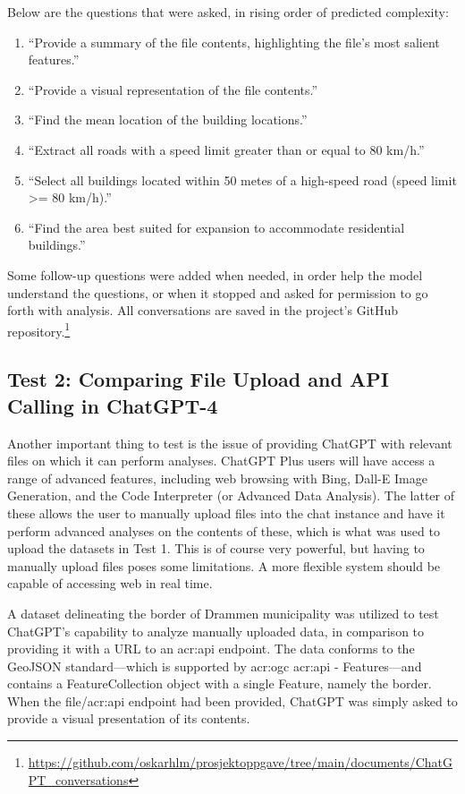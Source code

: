 Below are the questions that were asked, in rising order of predicted complexity:

\begin{enumerate}
    \item \enquote{Provide a summary of the file contents, highlighting the file's most salient features.}
    \item \enquote{Provide a visual representation of the file contents.}
    \item \enquote{Find the mean location of the building locations.}
    \item \enquote{Extract all roads with a speed limit greater than or equal to 80 km/h.}
    \item \enquote{Select all buildings located within 50 metes of a high-speed road (speed limit >= 80 km/h).}
    \item \enquote{Find the area best suited for expansion to accommodate residential buildings.}
\end{enumerate}
\label{enum:gpt-gis-questions}

\noindent Some follow-up questions were added when needed, in order help the model understand the questions, or when it stopped and asked for permission to go forth with analysis. All conversations are saved in the project's GitHub repository.\footnote{\url{https://github.com/oskarhlm/prosjektoppgave/tree/main/documents/ChatGPT_conversations}}

\subsection{Test 2: Comparing File Upload and API Calling in ChatGPT-4}

Another important thing to test is the issue of providing ChatGPT with relevant files on which it can perform analyses. ChatGPT Plus users will have access a range of advanced features, including web browsing with Bing, Dall-E Image Generation, and the Code Interpreter (or Advanced Data Analysis). The latter of these allows the user to manually upload files into the chat instance and have it perform advanced analyses on the contents of these, which is what was used to upload the datasets in Test 1. This is of course very powerful, but having to manually upload files poses some limitations. A more flexible system should be capable of accessing web  in real time.

A dataset delineating the border of Drammen municipality was utilized to test ChatGPT's capability to analyze manually uploaded data, in comparison to providing it with a URL to an \acrshort{acr:api} endpoint. The data conforms to the GeoJSON standard---which is supported by \acrshort{acr:ogc} \acrshort{acr:api} - Features---and contains a FeatureCollection object with a single Feature, namely the border. When the file/\acrshort{acr:api} endpoint had been provided, ChatGPT was simply asked to provide a visual presentation of its contents.

